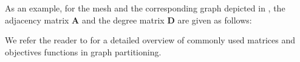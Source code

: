 \documentclass[../paper.tex]{subfiles}
\begin{document}
    As an example, for the mesh and the corresponding graph depicted in , the adjacency matrix $\mathbf{A}$ and the degree matrix $\mathbf{D}$ are given as follows:
    
    \vspace{5mm}
    
    
    
    \vspace{5mm}
    
    We refer the reader to \cite{doi:https://doi.org/10.1002/9781118601181.ch1} for a detailed overview of commonly used matrices and objectives functions in graph partitioning.
\end{document}
